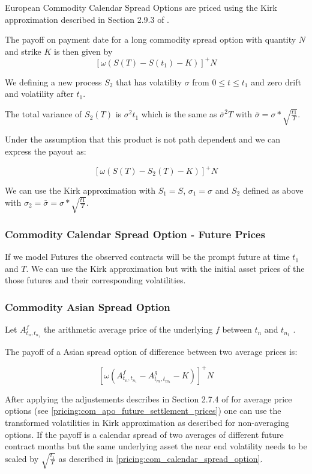 European Commodity Calendar Spread Options are priced using the Kirk approximation described in Section 2.9.3 of \cite{Clark_2014}.

The payoff on payment date for a long commodity spread option with quantity $N$ and strike $K$ is then given by
\begin{equation}
\left[ \omega \left( S(T) - S(t_1) - K \right) \right]^{+} N
\end{equation}

We defining a new process $S_2$ that has volatility $\sigma$ from $0 \le t \le t_1$ and zero drift and volatility after $t_1$.

The total variance of $S_2(T)$ is $\sigma^2 t_1$ which is the same as $\bar{\sigma}^2T$ with $\bar{\sigma} = \sigma * \sqrt{\frac{t1}{T}}$.

Under the assumption that this product is not path dependent and we can express the payout as:

\begin{equation}
\left[ \omega \left( S(T) - S_2(T) - K \right) \right]^{+} N
\end{equation}

We can use the Kirk approximation with $S_1 = S$, $\sigma_1 =\sigma$ and $S_2$ defined as above with $\sigma_2 = \bar{\sigma} = \sigma * \sqrt{\frac{t1}{T}}$.

\subsubsection{Commodity Calendar Spread Option - Future Prices}
\label{pricing:com_calendar_spread_option_future}
If we model Futures the observed contracts will be the prompt future at time $t_1$ and $T$. We can use the Kirk approximation but with the initial asset prices of the those futures and their corresponding volatilities.

\subsubsection{Commodity Asian Spread Option}
\label{pricing:com_asian_spread_option}

Let $A^f_{t_n,t_{n_1}}$ the arithmetic average price of the underlying $f$ between $t_n$ and $t_{n_1}$ .

The payoff of a Asian spread option of difference between two average prices is:

\begin{equation}
\left[ \omega \left( A^f_{t_n,t_{n_1}} - A^g_{t_m,t_{m_1}} - K \right) \right]^{+} N
\end{equation}

After applying the adjustements describes in Section 2.7.4 of \cite{Clark_2014} for average price options (see \ref{pricing:com_apo_future_settlement_prices})
one can use the transformed volatilities in Kirk approximation as described for non-averaging options.
If the payoff is a calendar spread of two averages of different future contract months but the same
underlying asset the near end volatility needs to be scaled by
$\sqrt{\frac{t_1}{T}}$ as described in \ref{pricing:com_calendar_spread_option}.